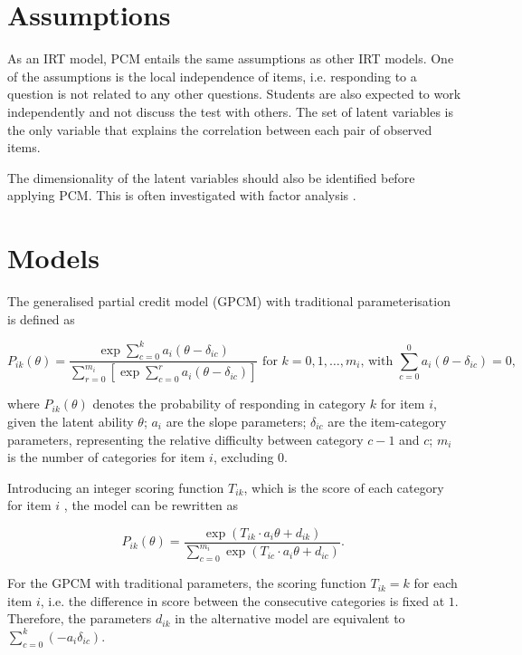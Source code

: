 \documentclass[a4paper]{report}
\begin{document}
\section{Assumptions}

As an IRT model, PCM entails the same assumptions as other IRT models. One of the assumptions is the local independence of items, i.e. responding to a question is not related to any other questions. Students are also expected to work independently and not discuss the test with others. The set of latent variables is the only variable that explains the correlation between each pair of observed items. 

The dimensionality of the latent variables should also be identified before applying PCM. This is often investigated with factor analysis \cite{mirt}. 


\section{Models}

The generalised partial credit model (GPCM) with traditional parameterisation \cite{IRT} is defined as

$$P_{ik}(\theta)= \frac{\displaystyle \exp \sum_{c=0}^{k} a_i (\theta-\delta_{ic})}{\displaystyle \sum_{r=0}^{m_i} \left[ \exp \sum_{c=0}^r a_i (\theta-\delta_{ic}) \right]} \text{ for } k=0,1,\ldots,m_i \text{, with } \sum_{c=0}^0 a_i (\theta-\delta_{ic}) = 0 \text{, }$$

\noindent
where $P_{ik}(\theta)$ denotes the probability of responding in category $k$ for item $i$, given the latent ability $\theta$; $a_i$ are the slope parameters; $\delta_{ic}$ are the item-category parameters, representing the relative difficulty between category $c-1$ and $c$; $m_i$ is the number of categories for item $i$, excluding $0$. 

Introducing an integer scoring function $T_{ik}$, which is the score of each category for item $i$ \cite{gpcmiic}, the model can be rewritten as 

$$P_{ik}(\theta) = \frac{\exp (T_{ik} \cdot a_i \theta + d_{ik})}{\displaystyle \sum_{c=0}^{m_i} \exp (T_{ic} \cdot a_i \theta + d_{ic})} \text{. }$$

For the GPCM with traditional parameters, the scoring function $T_{ik} = k$ for each item $i$, i.e. the difference in score between the consecutive categories is fixed at $1$. Therefore, the parameters $d_{ik}$ in the alternative model are equivalent to $\sum_{c=0}^k (-a_i \delta_{ic})$. 
\end{document}
